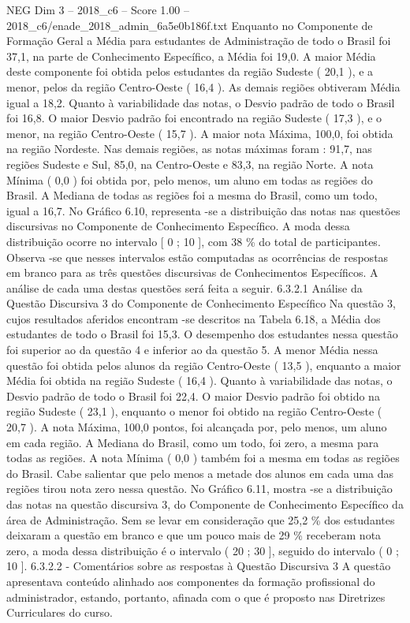 \begin{textsample}{NEG Dim 3 – 2018\_c6 – Score 1.00 – 2018\_c6/enade\_2018\_admin\_6a5e0b186f.txt}
Enquanto no Componente de Formação Geral a Média para estudantes de Administração de todo o Brasil foi 37,1, na parte de Conhecimento Específico, a Média foi 19,0.
A maior Média deste componente foi obtida pelos estudantes da região Sudeste ( 20,1 ), e a menor, pelos da região Centro-Oeste ( 16,4 ).
As demais regiões obtiveram Média igual a 18,2.
Quanto à variabilidade das notas, o Desvio padrão de todo o Brasil foi 16,8.
O maior Desvio padrão foi encontrado na região Sudeste ( 17,3 ), e o menor, na região Centro-Oeste ( 15,7 ).
A maior nota Máxima, 100,0, foi obtida na região Nordeste.
Nas demais regiões, as notas máximas foram : 91,7, nas regiões Sudeste e Sul, 85,0, na Centro-Oeste e 83,3, na região Norte.
A nota Mínima ( 0,0 ) foi obtida por, pelo menos, um aluno em todas as regiões do Brasil.
A Mediana de todas as regiões foi a mesma do Brasil, como um todo, igual a 16,7.
No Gráfico 6.10, representa -se a distribuição das notas nas questões discursivas no Componente de Conhecimento Específico.
A moda dessa distribuição ocorre no intervalo [ 0 ; 10 ], com 38 \% do total de participantes.
Observa -se que nesses intervalos estão computadas as ocorrências de respostas em branco para as três questões discursivas de Conhecimentos Específicos.
A análise de cada uma destas questões será feita a seguir. 6.3.2.1 Análise da Questão Discursiva 3 do Componente de Conhecimento Específico Na questão 3, cujos resultados aferidos encontram -se descritos na Tabela 6.18, a Média dos estudantes de todo o Brasil foi 15,3.
O desempenho dos estudantes nessa questão foi superior ao da questão 4 e inferior ao da questão 5.
A menor Média nessa questão foi obtida pelos alunos da região Centro-Oeste ( 13,5 ), enquanto a maior Média foi obtida na região Sudeste ( 16,4 ).
Quanto à variabilidade das notas, o Desvio padrão de todo o Brasil foi 22,4.
O maior Desvio padrão foi obtido na região Sudeste ( 23,1 ), enquanto o menor foi obtido na região Centro-Oeste ( 20,7 ).
A nota Máxima, 100,0 pontos, foi alcançada por, pelo menos, um aluno em cada região.
A Mediana do Brasil, como um todo, foi zero, a mesma para todas as regiões.
A nota Mínima ( 0,0 ) também foi a mesma em todas as regiões do Brasil.
Cabe salientar que pelo menos a metade dos alunos em cada uma das regiões tirou nota zero nessa questão.
No Gráfico 6.11, mostra -se a distribuição das notas na questão discursiva 3, do Componente de Conhecimento Específico da área de Administração.
Sem se levar em consideração que 25,2 \% dos estudantes deixaram a questão em branco e que um pouco mais de 29 \% receberam nota zero, a moda dessa distribuição é o intervalo ( 20 ; 30 ], seguido do intervalo ( 0 ; 10 ]. 6.3.2.2 - Comentários sobre as respostas à Questão Discursiva 3 A questão apresentava conteúdo alinhado aos componentes da formação profissional do administrador, estando, portanto, afinada com o que é proposto nas Diretrizes Curriculares do curso.

\end{textsample}
